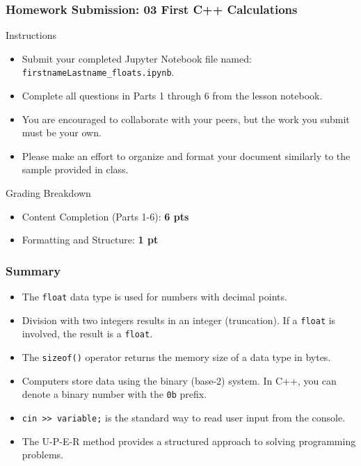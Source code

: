 \documentclass{beamer}
\begin{document}
\begin{frame}
\frametitle{Homework Submission: 03 First C++ Calculations }

\begin{alertblock}{Instructions}
\begin{itemize}
    \item Submit your completed Jupyter Notebook file named: \\ \texttt{firstnameLastname\_floats.ipynb}.
    \pause
    \item Complete all questions in Parts 1 through 6 from the lesson notebook.
    \pause
    \item You are encouraged to collaborate with your peers, but the work you submit must be your own.
    \pause
    \item Please make an effort to organize and format your document similarly to the sample provided in class.
\end{itemize}
\end{alertblock}

\pause

\begin{block}{Grading Breakdown}
    \begin{itemize}
        \item Content Completion (Parts 1-6): \textbf{6 pts}
        \item Formatting and Structure: \textbf{1 pt}
    \end{itemize}
\end{block}

\end{frame}

\begin{frame}
\frametitle{Summary}
\begin{itemize}
    \item The \texttt{float} data type is used for numbers with decimal points.
    \item Division with two integers results in an \alert{integer} (truncation). If a \texttt{float} is involved, the result is a \texttt{float}.
    \item The \texttt{sizeof()} operator returns the memory size of a data type in \alert{bytes}.
    \item Computers store data using the \alert{binary} (base-2) system. In C++, you can denote a binary number with the \texttt{0b} prefix.
    \item \texttt{cin >> variable;} is the standard way to read user input from the console.
    \item The \alert{U-P-E-R} method provides a structured approach to solving programming problems.
\end{itemize}
\end{frame}
\end{document}
